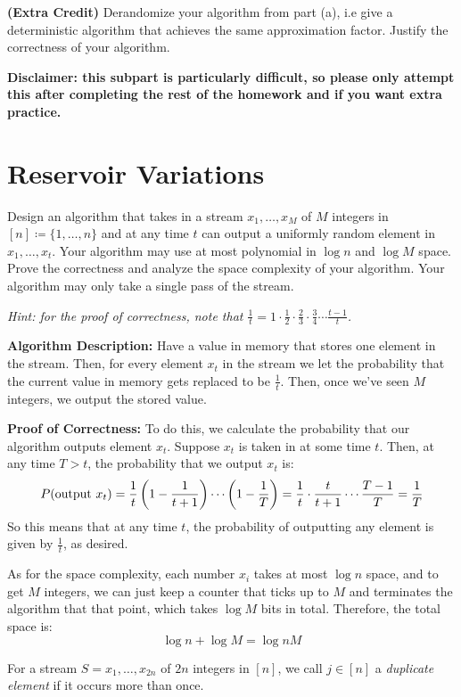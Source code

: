 \documentclass[11pt]{article}
\begin{document}
\begin{subparts}
\item \textbf{(Extra Credit)} Derandomize your algorithm from part (a), i.e give a deterministic algorithm that achieves the same approximation factor. Justify the correctness of your algorithm.

\textbf{Disclaimer: this subpart is particularly difficult, so please only attempt this after completing the rest of the homework and if you want extra practice.}
\end{subparts}

\newpage

\section{Reservoir Variations}
\begin{subparts}
    \subpart Design an algorithm that takes in a stream $x_1,\dots,x_M$ of $M$ integers in $[n] \coloneqq \{1, \dots, n\}$ and at any time $t$ can output a uniformly random element in $x_1,\dots,x_t$.  Your algorithm may use at most polynomial in $\log n$ and $\log M$ space.  Prove the correctness and analyze the space complexity of your algorithm.  Your algorithm may only take a single pass of the stream.
    
    \textit{Hint: for the proof of correctness, note that $\frac{1}{t}=1\cdot\frac{1}{2}\cdot\frac{2}{3}\cdot\frac{3}{4}\cdots\frac{t-1}{t}$.}

	\begin{solution}
		\textbf{Algorithm Description:} Have a value in memory that stores one element in the stream. 
		Then, for every element \( x_t \) in the stream we let the probability that the current value in memory gets replaced to 
		be \( \frac{1}{t} \). Then, once we've seen \( M \) integers, we output the stored value. 

		\textbf{Proof of Correctness:} To do this, we calculate the probability that our algorithm outputs element \( x_t \). 
		Suppose \( x_t \) is taken in at some time \( t \). Then, at any time \( T > t \), the probability that we output 
		\( x_t \) is:
		\[
		P(\text{output \( x_t \)}) = \frac{1}{t}\left( 1 - \frac{1}{t+1} \right) \cdots \left( 1 - \frac{1}{T} \right) = 
		\frac{1}{t}\cdot \frac{t}{t+1} \cdots \frac{T-1}{T} = \frac{1}{T}
		\] 
		So this means that at any time \( t \), the probability of outputting any element is given by \( \frac{1}{t} \), as desired. 

		As for the space complexity, each number \( x_i \) takes at most \( \log n \) space, and to get \( M \) integers, 
		we can just keep a counter that ticks up to \( M \) and terminates the algorithm that that point, which takes 
		\(  \log M \) bits in total. Therefore, the total space is:
		\[
		\log n + \log M = \log nM
		\] 
	\end{solution}
    \subpart For a stream $S=x_1,\dots,x_{2n}$ of $2n$ integers in $[n]$, we call $j\in[n]$ a \textit{duplicate element} if it occurs more than once.
	

\end{subparts}
\end{document}
